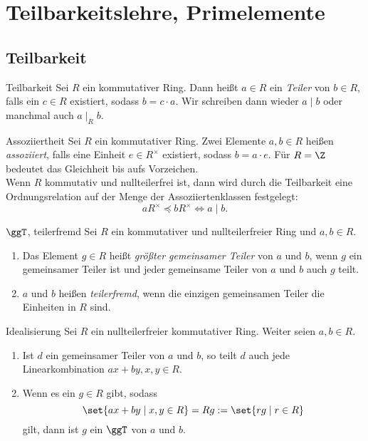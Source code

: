 \section{Teilbarkeitslehre, Primelemente}

\subsection{Teilbarkeit}

\begin{karte}{Teilbarkeit}
    Sei \(R\) ein kommutativer Ring. Dann heißt \(a\in R\) ein 
    \textit{Teiler} von \(b\in R\), falls ein \(c\in R\) 
    existiert, sodass \(b=c\cdot a\). Wir schreiben dann wieder 
    \( a \;|\; b \) oder manchmal auch \( a \;|_R \; b \).
\end{karte}

\begin{karte}{Assoziiertheit}
    Sei \(R\) ein kommutativer Ring. Zwei Elemente \(a,b\in R\) 
    heißen \textit{assoziiert}, falls eine Einheit \(e\in R^\times\) 
    existiert, sodass \(b = a \cdot e\). 
    Für \(R=\Z\) bedeutet das Gleichheit bis aufs Vorzeichen.\\
    Wenn \(R\) kommutativ und nullteilerfrei ist, dann wird durch 
    die Teilbarkeit eine Ordnungsrelation auf der Menge der Assoziiertenklassen 
    festgelegt: \[ a R^\times \preceq b R^\times \Leftrightarrow a \;|\; b. \]
\end{karte}

\begin{karte}{\( \ggT \), teilerfremd}
    Sei \(R\) ein kommutativer und  nullteilerfreier Ring und \(a,b\in R\).
    \begin{enumerate}
        \item Das Element \(g\in R\) heißt \textit{größter gemeinsamer Teiler} 
        von \(a\) und \(b\), wenn \(g\) ein gemeinsamer Teiler ist und jeder 
        gemeinsame Teiler von \(a\) und \(b\) auch \(g\) teilt.
        \item \(a\) und \(b\) heißen \textit{teilerfremd}, wenn die einzigen 
        gemeinsamen Teiler die Einheiten in \(R\) sind. 
    \end{enumerate}
\end{karte}

\begin{karte}{Idealisierung}
    Sei \(R\) ein nullteilerfreier kommutativer Ring. Weiter seien \(a,b\in R\). 
    \begin{enumerate}
        \item Ist \(d\) ein gemeinsamer Teiler von \(a\) und \(b\), so teilt \(d\) 
        auch jede Linearkombination \(ax + by, x,y\in R\).
        \item Wenn es ein \(g\in R\) gibt, sodass 
        \[ \set{ ax+by \;|\; x,y\in R } = Rg := \set{rg \;|\; r\in R} \]
        gilt, dann ist \(g\) ein \(\ggT\) von \(a\) und \(b\).
    \end{enumerate}
\end{karte}

